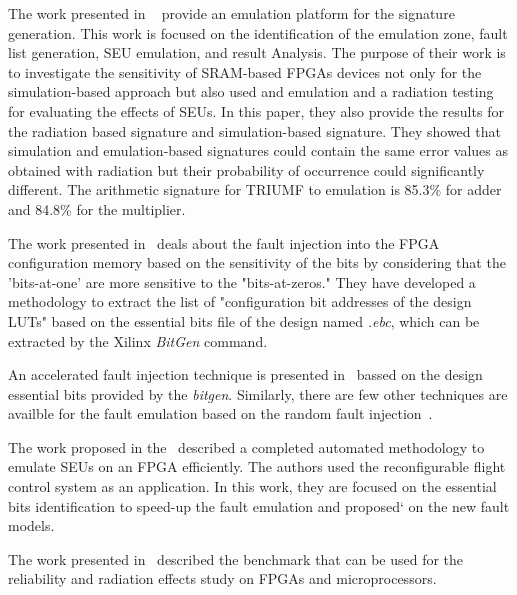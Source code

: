 The work presented in ~\cite{hobeika2014multi} provide an emulation platform for the signature generation. This work is focused on the identification of the emulation zone,  fault list generation, SEU emulation, and result Analysis. The purpose of their work is to investigate the sensitivity of SRAM-based FPGAs devices not only for the simulation-based approach but also used and emulation and a radiation testing for evaluating the effects of SEUs. In this paper, they also provide the results for the radiation based signature and simulation-based signature. They showed that simulation and emulation-based signatures could contain the same error values as obtained with radiation but their probability of occurrence could significantly different. The arithmetic signature for TRIUMF to emulation is 85.3\% for adder and 84.8\% for the multiplier. 

The work presented in~\citep{souari2015optimization, souari2016towards} deals about the fault injection into the FPGA configuration memory based on the sensitivity of the bits by considering that the 'bits-at-one' are more sensitive to the "bits-at-zeros." They have developed a methodology to extract the list of "configuration bit addresses of the design LUTs" based on the essential bits file of the design named \textit{.ebc},  which can be extracted by the Xilinx \textit{BitGen} command.



An accelerated fault injection technique is presented in~\citep{di2014fault} bassed on the design essential bits provided by the \textit{bitgen}. Similarly, there are few other techniques are availble for the fault emulation based on the random fault injection~\citep{faure2005single}.


The work proposed in the~\cite{hobeika2013flight} described a completed automated methodology to emulate SEUs on an FPGA efficiently. The authors used the reconfigurable flight control system as an application.
In this work, they are focused on the essential bits identification to speed-up the fault emulation and proposed` on the new fault models.



The work presented in~\cite{quinn2015using} described the benchmark that can be used for the reliability and radiation effects study on FPGAs and microprocessors. 

